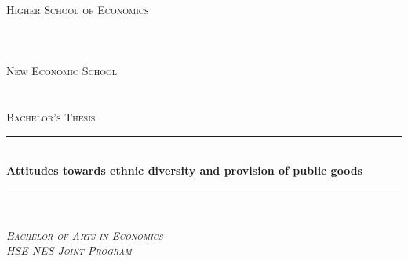 \documentclass[12pt]{article}
\begin{document}
\begin{titlepage}

\newcommand{\HRule}{\rule{\linewidth}{0.5mm}} %

\center %

\textsc{Higher School of Economics}\\
\textsc{}\\
\textsc{}\\
\textsc{}\\[1cm] %

\textsc{New Economic School}\\
\textsc{}\\
\textsc{}\\[2cm]

\textsc{\textmd{Bachelor’s Thesis
}}\\[0.5cm]
\begin{spacing}{1.5}
\HRule \\[0.4cm]
{ \huge \bfseries Attitudes towards ethnic diversity and provision of public goods}\\[0.4cm] %
\HRule \\[0.5cm]
\end{spacing}

\textsc{\textit{\large Bachelor of Arts in Economics}}\\[0.2cm]
\textsc{\textit{\large HSE-NES Joint Program}}\\[2cm]



\end{titlepage}
\end{document}
